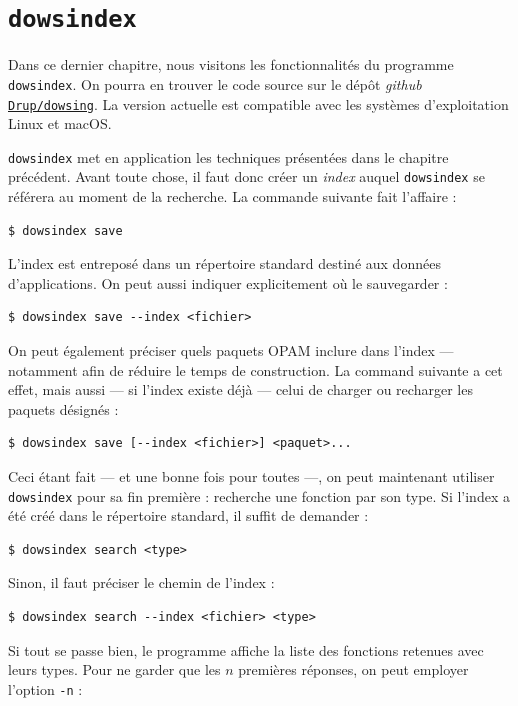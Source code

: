 \documentclass[a4paper]{report}
\theoremstyle{definition}
\newcommand{\dowsindex}{\texttt{dowsindex}\xspace}
\begin{document}
\chapter{\dowsindex}

Dans ce dernier chapitre, nous visitons les fonctionnalités du programme \dowsindex. On pourra en trouver le code source sur le dépôt \textit{github} \href{https://github.com/Drup/dowsing}{\texttt{Drup/dowsing}}. La version actuelle est compatible avec les systèmes d'exploitation Linux et macOS.

\dowsindex met en application les techniques présentées dans le chapitre précédent. Avant toute chose, il faut donc créer un \emph{index} auquel \dowsindex se référera au moment de la recherche. La commande suivante fait l'affaire :

\begin{verbatim}
$ dowsindex save
\end{verbatim}

L'index est entreposé dans un répertoire standard destiné aux données d'applications. On peut aussi indiquer explicitement où le sauvegarder :

\begin{verbatim}
$ dowsindex save --index <fichier>
\end{verbatim}

On peut également préciser quels paquets OPAM inclure dans l'index — notamment afin de réduire le temps de construction. La command suivante a cet effet, mais aussi — si l'index existe déjà — celui de charger ou recharger les paquets désignés :

\begin{verbatim}
$ dowsindex save [--index <fichier>] <paquet>...
\end{verbatim}

Ceci étant fait — et une bonne fois pour toutes —, on peut maintenant utiliser \dowsindex pour sa fin première : recherche une fonction par son type. Si l'index a été créé dans le répertoire standard, il suffit de demander :

\begin{verbatim}
$ dowsindex search <type>
\end{verbatim}

Sinon, il faut préciser le chemin de l'index :

\begin{verbatim}
$ dowsindex search --index <fichier> <type>
\end{verbatim}

Si tout se passe bien, le programme affiche la liste des fonctions retenues avec leurs types. Pour ne garder que les $n$ premières réponses, on peut employer l'option \texttt{-n} :
\end{document}
